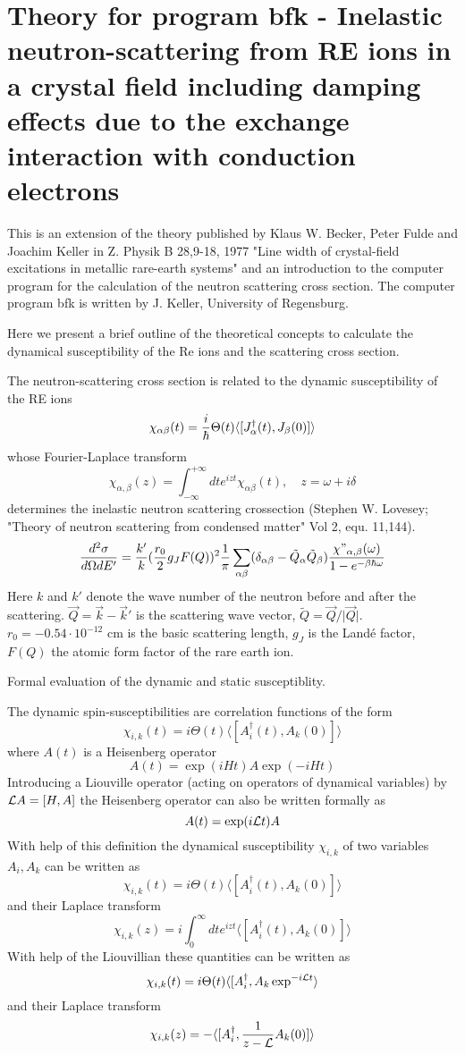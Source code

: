 \section{Theory for  program {\prg bfk} - Inelastic neutron-scattering from RE ions in a crystal field
including damping effects due to the exchange interaction with conduction
electrons}\label{bfktheory}

\medskip
This is an extension  of the theory published by Klaus W. Becker, Peter Fulde and
Joachim Keller in Z. Physik B 28,9-18, 1977 
"Line width of crystal-field excitations in metallic rare-earth systems"
and an  introduction to the computer program for the calculation of  the neutron 
scattering cross section. The computer program {\prg bfk} is written by J. Keller,
University of Regensburg.

\noindent
Here we present a brief outline of the theoretical concepts to calculate the
dynamical susceptibility of the Re ions and the scattering cross section.  

The neutron-scattering cross section is related to the dynamic susceptibility
of the  RE ions 
$$
\chi_{\alpha\beta}(t)={i\over \hbar} \Theta(t)\langle [J^\dagger_\alpha(t), J_\beta(0)]\rangle 
$$
whose Fourier-Laplace transform
$$
\chi_{\alpha,\beta}(z)=\int_{-\infty}^{+\infty} dt e^{izt}\chi_{\alpha\beta}(t), \quad z=\omega
+i\delta 
$$
determines the inelastic neutron scattering crossection   
(Stephen W. Lovesey; "Theory of neutron 
scattering from condensed matter"
Vol 2, equ. 11,144).
$$
{d^2\sigma \over d\Omega d E'}=  {k' \over
k}({r_0\over 2}g_J F(Q))^2{1\over \pi }
\sum_{\alpha\beta}(\delta_{\alpha\beta} 
- \tilde Q_\alpha \tilde Q_\beta)
{ \chi{"}_{\alpha,\beta}(\omega)\over 1-e^{-\beta \hbar \omega}} 
$$
Here $k$ and
$ k'$ denote the  wave number of the neutron before and after the
scattering. $\vec Q = \vec k - \vec k'$ is the scattering wave vector,
$\tilde Q = \vec Q/\vert\vec Q\vert$. 
$r_0= -0.54 \cdot 10^{-12}$ cm is the basic scattering length, $g_J$ is the Land\'e factor, 
$F(Q)$ the atomic form factor of the
rare earth ion.
  
\bigskip
\noindent
Formal evaluation of the dynamic and static susceptiblity.

The dynamic spin-susceptibilities are correlation functions of the form
$$
\chi_{i,k}(t)=i \Theta(t) \langle [A_i^\dagger(t),A_k(0)]\rangle
$$ 
where $A(t)$ is a Heisenberg operator
$$
A(t)= \exp(iHt)A\exp(-iHt)
$$
Introducing a Liouville operator (acting on operators of dynamical
variables) by ${\cal L}A = [H,A]$  the Heisenberg operator can also be
written formally as  
$$
A(t)= \exp(i{\cal L}t) A
$$
With help of this definition the dynamical susceptibility $\chi_{i,k}$ of 
two variables $A_i, A_k$ can be written as
$$
\chi_{i,k}(t)=i \Theta(t) \langle [A_i^\dagger(t),A_k(0)]\rangle
$$ 
and their Laplace transform
$$
\chi_{i,k}(z)=i\int_0^\infty dt e^{izt} \langle [A_i^\dagger(t),A_k(0)]\rangle
$$ 
With help of the Liouvillian these quantities can be written as
$$
\chi_{i,k}(t)=i \Theta(t) \langle [A_i^\dagger,A_k\exp^{-i{\cal L}t}\rangle
$$
and their Laplace transform
$$
\chi_{i,k}(z)= -\langle [A_i^\dagger,{1\over {z-\cal
L}}A_k(0)]\rangle
$$ 

